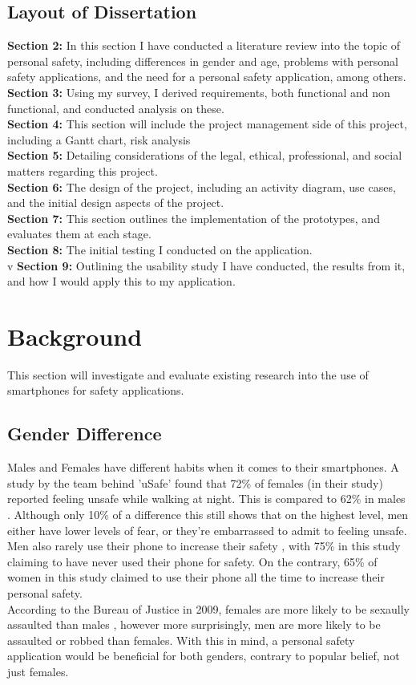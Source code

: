 \documentclass[a4paper]{report}
\begin{document}
\section{Layout of Dissertation}
\textbf{Section 2:} In this section I have conducted a literature review into the topic of personal safety, including differences in gender and age, problems with personal safety applications, and the need for a personal safety application, among others. \\
\textbf{Section 3:} Using my survey, I derived requirements, both functional and non functional, and conducted analysis on these. \\
\textbf{Section 4:} This section will include the project management side of this project, including a Gantt chart, risk analysis\\
\textbf{Section 5:} Detailing considerations of the legal, ethical, professional, and social matters regarding this project. \\
\textbf{Section 6:} The design of the project, including an activity diagram, use cases, and the initial design aspects of the project. \\
\textbf{Section 7:} This section outlines the implementation of the prototypes, and evaluates them at each stage. \\
\textbf{Section 8:} The initial testing I conducted on the application. \\v
\textbf{Section 9:} Outlining the usability study I have conducted, the results from it, and how I would apply this to my application. \\
\newpage
\chapter{Background}
\label{sec:Background}
This section will investigate and evaluate existing research into the use of smartphones for safety applications.
\section{Gender Difference}
\label{sec:GenderDifference}
Males and Females have different habits when it comes to their smartphones. A study by the team behind 'uSafe' found that 72\% of females (in their study)
reported feeling unsafe while walking at night. This is compared to 62\% in males \cite{usafepaper}. Although only 10\% of a difference this still shows
that on the highest level, men either have lower levels of fear, or they're embarrassed to admit to feeling unsafe. \\ Men also rarely use their phone to increase their safety \cite{tennakoon}, with 75\% in this study claiming to have
never used their phone for safety. On the contrary, 65\% of women in this study claimed to use their phone all the time to increase their personal safety.
\\According to the Bureau of Justice in 2009, females are more likely to be sexaully assaulted than males \cite{boj}, however more surprisingly, men are more likely
to be assaulted or robbed than females. With this in mind, a personal safety application would be beneficial for both genders, contrary to popular belief, not just
females. 
\end{document}
